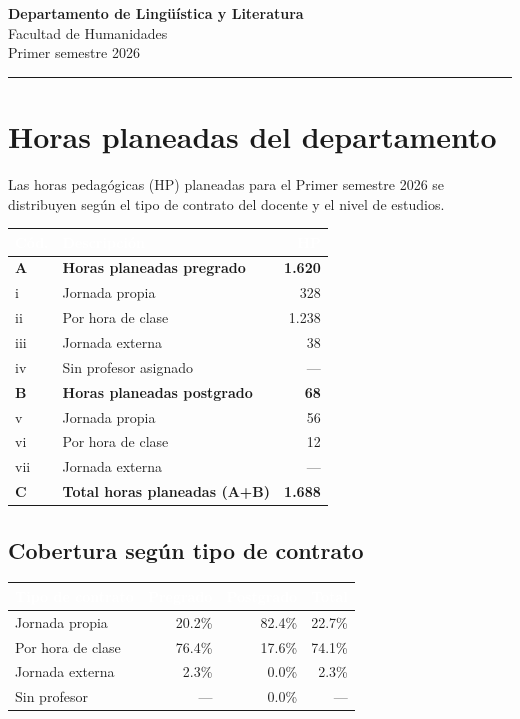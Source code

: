 \documentclass[11pt, a4paper]{article}
\begin{document}
\begin{center}
  {\Large\bfseries\color{usachDark} Departamento de Lingüística y Literatura} \\[0.4em]
  {\large\color{usachTeal} Facultad de Humanidades} \\[0.2em]
  {\normalsize\color{gray} Primer semestre 2026}
\end{center}
\vspace{0.5em}
\textcolor{usachTeal}{\rule{\linewidth}{2pt}}
\vspace{1em}

\section{Horas planeadas del departamento}

Las horas pedagógicas (HP) planeadas para el Primer semestre 2026 se distribuyen según el tipo de contrato del docente y el nivel de estudios.

\begin{tabularx}{\linewidth}{l X r}
\toprule
\rowcolor{usachDark} \textbf{\textcolor{white}{Cód.}} & \textbf{\textcolor{white}{Descripción}} & \textbf{\textcolor{white}{HP}} \\
\midrule
\rowcolor{rowHighlight}\textbf{A} & \textbf{Horas planeadas pregrado} & \textbf{1.620} \\
\rowcolor{rowEven}i & Jornada propia & 328 \\
ii & Por hora de clase & 1.238 \\
\rowcolor{rowEven}iii & Jornada externa & 38 \\
iv & Sin profesor asignado & --- \\
\rowcolor{rowHighlight}\textbf{B} & \textbf{Horas planeadas postgrado} & \textbf{68} \\
v & Jornada propia & 56 \\
\rowcolor{rowEven}vi & Por hora de clase & 12 \\
vii & Jornada externa & --- \\
\rowcolor{rowHighlight}\textbf{C} & \textbf{Total horas planeadas (A+B)} & \textbf{1.688} \\
\bottomrule
\end{tabularx}

\subsection{Cobertura según tipo de contrato}

\begin{tabular}{lrrr}
\toprule
\rowcolor{usachDark} \textbf{\textcolor{white}{Tipo de contrato}} & \textbf{\textcolor{white}{Pregrado}} & \textbf{\textcolor{white}{Postgrado}} & \textbf{\textcolor{white}{Total}} \\
\midrule
Jornada propia & 20.2\% & 82.4\% & 22.7\% \\
\rowcolor{rowEven}Por hora de clase & 76.4\% & 17.6\% & 74.1\% \\
Jornada externa & 2.3\% & 0.0\% & 2.3\% \\
\rowcolor{rowEven}Sin profesor & --- & 0.0\% & --- \\
\bottomrule
\end{tabular}
\end{document}
